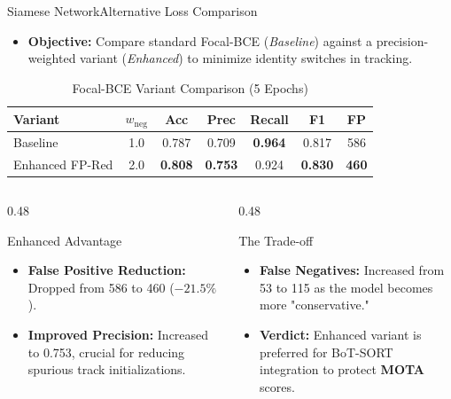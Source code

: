 \documentclass[10pt]{beamer}
\begin{document}
\begin{frame}{Siamese Network}{Alternative Loss Comparison}
    \begin{itemize}
        \item \textbf{Objective:} Compare standard Focal-BCE (\textit{Baseline}) against a precision-weighted variant (\textit{Enhanced}) to minimize identity switches in tracking.
    \end{itemize}

    \begin{table}
        \small
        \centering
        \caption{Focal-BCE Variant Comparison (5 Epochs)}
        \label{tab:loss_comparison}
        \begin{tabular}{lcccccc}
            \toprule
            Variant & $w_{\text{neg}}$ & Acc & Prec & Recall & F1 & \textbf{FP} \\
            \midrule
            Baseline & 1.0 & 0.787 & 0.709 & \textbf{0.964} & 0.817 & 586 \\
            Enhanced FP-Red & 2.0 & \textbf{0.808} & \textbf{0.753} & 0.924 & \textbf{0.830} & \textbf{460} \\
            \bottomrule
        \end{tabular}
    \end{table}

    \vspace{2mm}

    \begin{columns}[T]
        \begin{column}{0.48\textwidth}
            \begin{block}{Enhanced Advantage}
                \begin{itemize}
                    \scriptsize
                    \item \textbf{False Positive Reduction:} Dropped from 586 to 460 (\textbf{$-21.5\%$}).
                    \item \textbf{Improved Precision:} Increased to 0.753, crucial for reducing spurious track initializations.
                \end{itemize}
            \end{block}
        \end{column}
        
        \begin{column}{0.48\textwidth}
            \begin{block}{The Trade-off}
                \begin{itemize}
                    \scriptsize
                    \item \textbf{False Negatives:} Increased from 53 to 115 as the model becomes more "conservative."
                    \item \textbf{Verdict:} Enhanced variant is preferred for BoT-SORT integration to protect \textbf{MOTA} scores.
                \end{itemize}
            \end{block}
        \end{column}
    \end{columns}
\end{frame}
\end{document}
